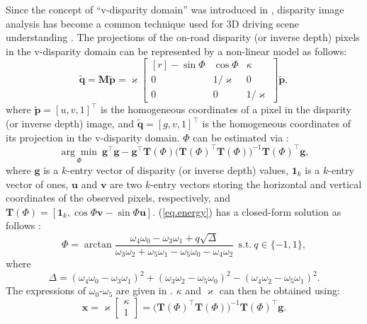 \documentclass[runningheads]{llncs}
\begin{document}
Since the concept of ``v-disparity domain'' was introduced in \cite{labayrade2003single}, disparity image analysis has become a common technique used for 3D driving scene understanding \cite{fan2019real}. The projections of the on-road disparity (or inverse depth) pixels in the v-disparity domain can be represented by a non-linear model as follows:
\begin{equation}
\tilde{\mathbf{q}}=\mathbf{M}\tilde{\mathbf{p}}={\varkappa}\begin{bmatrix*}[r]
-\sin\Phi & \cos\Phi & \kappa\\
0 & {1}/{\varkappa} & 0 \\
0 & 0 & {1}/{\varkappa}
\end{bmatrix*}\tilde{\mathbf{p}},
\end{equation}
where $\tilde{\mathbf{p}}=[u,v,1]^\top$ is the homogeneous coordinates of a pixel in the disparity (or inverse depth) image, and $\tilde{\mathbf{q}}=[g,v,1]^\top$ is the homogeneous coordinates of its projection in the v-disparity domain. $\Phi$ can be estimated via \cite{fan2019real}:
\begin{equation}
\underset{\Phi}{\arg\min}\  \mathbf{g}^\top\mathbf{g}-\mathbf{g}^\top\mathbf{T}(\Phi)\big(\mathbf{T}(\Phi)^\top\mathbf{T}(\Phi)\big)^{-1}\mathbf{T}(\Phi)^\top\mathbf{g},
\label{eq.energy}
\end{equation}
where $\mathbf{g}$ is a $k$-entry vector of disparity (or inverse depth) values, $\mathbf{1}_k$ is a $k$-entry vector of ones, $\mathbf{u}$ and $\mathbf{v}$ are two $k$-entry vectors storing the horizontal and vertical coordinates of the observed pixels, respectively, and $\mathbf{T}(\Phi)=[\mathbf{1}_k,\cos\Phi \mathbf{v}-\sin\Phi \mathbf{u}]$.  (\ref{eq.energy}) has a closed-form solution as follows \cite{fan2019road}:
\begin{equation}
\Phi=\arctan\frac{\omega_4\omega_0-\omega_3\omega_1+q\sqrt{\Delta}}{\omega_3\omega_2+\omega_5\omega_1-\omega_5\omega_0-\omega_4\omega_2}
\ \ \text{s.t.} \ q\in\{-1,1\},
\label{eq.phi}
\end{equation}
where
\begin{equation}
\Delta=(\omega_4\omega_0-\omega_3\omega_1)^2+(\omega_3\omega_2-\omega_5\omega_0)^2-(\omega_4\omega_2-\omega_5\omega_1)^2.
\label{eq.delta}
\end{equation}
The expressions of $\omega_0$-$\omega_5$ are given in \cite{fan2019road}. $\kappa$ and $\varkappa$ can then be obtained using:
\begin{equation}
\mathbf{x}=	\varkappa\begin{bmatrix}
    \kappa \\
    1
    \end{bmatrix}=\big(\mathbf{T}(\Phi)^\top\mathbf{T}(\Phi)\big)^{-1}\mathbf{T}(\Phi)^\top\mathbf{g}.
\end{equation}
\end{document}
